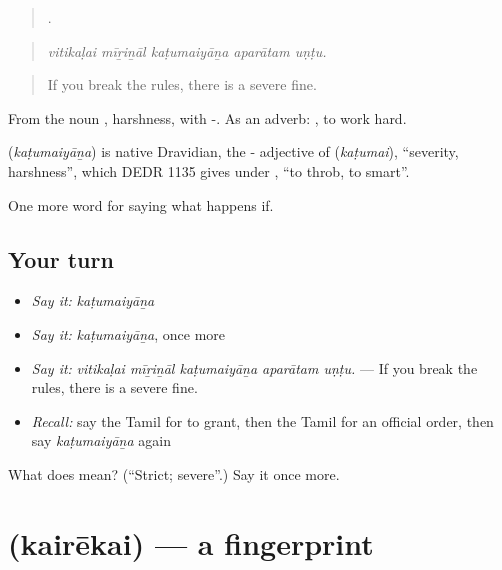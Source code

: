 \begin{quote}
    .
\end{quote}

\begin{quote}
\emph{vitikaḷai mīṟiṉāl kaṭumaiyāṉa aparātam uṇṭu.}
\end{quote}

\begin{quote}
If you break the rules, there is a severe fine.
\end{quote}

From the noun , harshness, with -. As an adverb:  , to work hard.

\begin{cousinweb}
\textbf{} (\emph{kaṭumaiyāṉa}) is native Dravidian, the - adjective of  (\emph{kaṭumai}), \textquotedblleft{}severity, harshness\textquotedblright{}, which DEDR 1135 gives under , \textquotedblleft{}to throb, to smart\textquotedblright{}.
\end{cousinweb}

\begin{grammarlens}[title={What you've built}]
One more word for saying what happens if.
\end{grammarlens}

\subsection*{Your turn}
\begin{itemize}
\raggedright
  \item \emph{Say it:} \emph{kaṭumaiyāṉa}
  \item \emph{Say it:} \emph{kaṭumaiyāṉa}, once more
  \item \emph{Say it:} \emph{vitikaḷai mīṟiṉāl kaṭumaiyāṉa aparātam uṇṭu.} — If you break the rules, there is a severe fine.
  \item \emph{Recall:} say the Tamil for to grant, then the Tamil for an official order, then say \emph{kaṭumaiyāṉa} again
\end{itemize}

\begin{tcolorbox}[breakable,colback=teal!4,colframe=teal!35!black,title={Before you move on}]
What does  mean? (\textquotedblleft{}Strict; severe\textquotedblright{}.) Say it once more.
\end{tcolorbox}
\section[\texorpdfstring{\ta{கைரேகை} (kairēkai)}{கைரேகை (kairēkai)}]{ (kairēkai) — a fingerprint}

